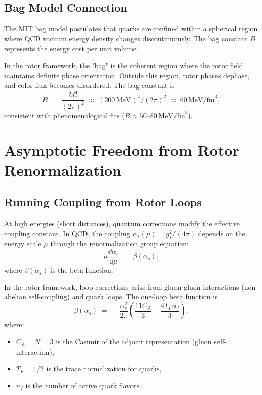 \documentclass[11pt,a4paper]{article}
\theoremstyle{definition}
\theoremstyle{plain}
\theoremstyle{remark}
\begin{document}
\subsection{Bag Model Connection}

The MIT bag model postulates that quarks are confined within a spherical region where QCD vacuum energy density changes discontinuously. The bag constant $B$ represents the energy cost per unit volume.

In the rotor framework, the "bag" is the coherent region where the rotor field maintains definite phase orientation. Outside this region, rotor phases dephase, and color flux becomes disordered. The bag constant is
\begin{equation}
B \;=\; \frac{M_\ast^4}{(2\pi)^2} \;\approx\; (200\,\text{MeV})^4/(2\pi)^2 \;\approx\; 60\,\text{MeV/fm}^3,
\end{equation}
consistent with phenomenological fits ($B \approx 50$--$80\,\text{MeV/fm}^3$).

\vspace{1em}

\section{Asymptotic Freedom from Rotor Renormalization}
\label{sec:asymptotic-freedom}

\subsection{Running Coupling from Rotor Loops}

At high energies (short distances), quantum corrections modify the effective coupling constant. In QCD, the coupling $\alpha_s(\mu) = g_s^2/(4\pi)$ depends on the energy scale $\mu$ through the renormalization group equation:
\begin{equation}
\mu \frac{\dd\alpha_s}{\dd\mu} \;=\; \beta(\alpha_s),
\label{eq:rge}
\end{equation}
where $\beta(\alpha_s)$ is the beta function.

In the rotor framework, loop corrections arise from gluon-gluon interactions (non-abelian self-coupling) and quark loops. The one-loop beta function is
\begin{equation}
\beta(\alpha_s) \;=\; -\frac{\alpha_s^2}{2\pi}\left(\frac{11C_A}{3} - \frac{4T_F n_f}{3}\right),
\label{eq:beta-function}
\end{equation}
where:
\begin{itemize}[leftmargin=*,itemsep=3pt]
  \item $C_A = N = 3$ is the Casimir of the adjoint representation (gluon self-interaction),
  \item $T_F = 1/2$ is the trace normalization for quarks,
  \item $n_f$ is the number of active quark flavors.
\end{itemize}
\end{document}
